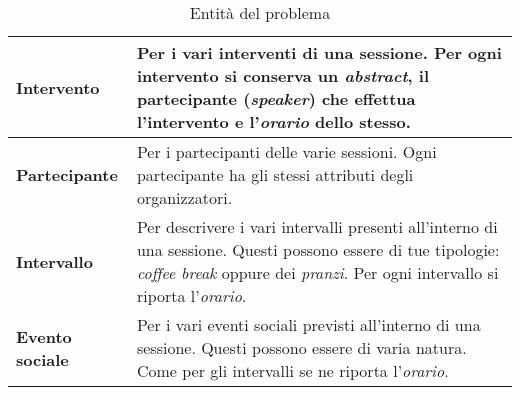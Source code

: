 \begin{table}[h!]
\begin{tabularx}{\textwidth}{|l|X|}
\textbf{Intervento} & Per i vari interventi di una sessione. Per ogni intervento si conserva un \textit{abstract}, il partecipante (\textit{speaker}) che effettua l'intervento e l'\textit{orario} dello stesso. \\ \hline
\textbf{Partecipante} & Per i partecipanti delle varie sessioni. Ogni partecipante ha gli stessi attributi degli organizzatori. \\ \hline
\textbf{Intervallo} & Per descrivere i vari intervalli presenti all'interno di una sessione. Questi possono essere di tue tipologie: \textit{coffee break} oppure dei \textit{pranzi}. Per ogni intervallo si riporta l'\textit{orario}. \\ \hline
\textbf{Evento sociale} & Per i vari eventi sociali previsti all'interno di una sessione. Questi possono essere di varia natura. Come per gli intervalli se ne riporta l'\textit{orario}. \\ \hline
\end{tabularx}
\caption{Entità del problema}\label{tab:entities}
\end{table}

